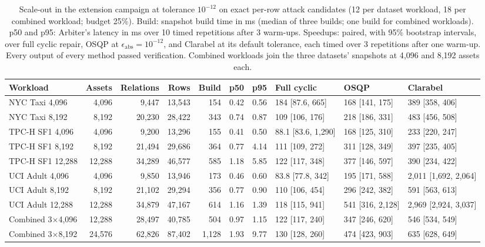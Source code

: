 \begin{table}[h]
\centering
\caption{Scale-out in the extension campaign at tolerance $10^{-12}$ on exact per-row attack candidates (12 per dataset workload, 18 per combined workload; budget 25\%). Build: snapshot build time in ms (median of three builds; one build for combined workloads). p50 and p95: Arbiter's latency in ms over 10 timed repetitions after 3 warm-ups. Speedups: paired, with 95\% bootstrap intervals, over full cyclic repair, OSQP at $\epsilon_{\mathrm{abs}} = 10^{-12}$, and Clarabel at its default tolerance, each timed over 3 repetitions after one warm-up. Every output of every method passed verification. Combined workloads join the three datasets' snapshots at 4{,}096 and 8{,}192 assets each.}
\label{tab:ext-scale}
\footnotesize
\setlength{\tabcolsep}{2.5pt}
\begin{tabular}{@{}lrrrrrrlll@{}}
\toprule
Workload & Assets & Relations & Rows & Build & p50 & p95 & Full cyclic & OSQP & Clarabel \\
\midrule
NYC Taxi 4{,}096 & 4{,}096 & 9{,}447 & 13{,}543 & 154 & 0.42 & 0.56 & 184 [87.6, 665] & 168 [141, 175] & 389 [358, 406] \\
NYC Taxi 8{,}192 & 8{,}192 & 20{,}230 & 28{,}422 & 343 & 0.74 & 0.87 & 109 [106, 176] & 218 [186, 331] & 483 [456, 508] \\
TPC-H SF1 4{,}096 & 4{,}096 & 9{,}200 & 13{,}296 & 155 & 0.41 & 0.50 & 88.1 [83.6, 1{,}290] & 168 [125, 310] & 233 [220, 247] \\
TPC-H SF1 8{,}192 & 8{,}192 & 21{,}494 & 29{,}686 & 364 & 0.77 & 4.14 & 111 [109, 272] & 311 [128, 349] & 397 [235, 405] \\
TPC-H SF1 12{,}288 & 12{,}288 & 34{,}289 & 46{,}577 & 585 & 1.18 & 5.85 & 122 [117, 348] & 377 [146, 597] & 390 [234, 422] \\
UCI Adult 4{,}096 & 4{,}096 & 9{,}850 & 13{,}946 & 173 & 0.46 & 0.60 & 83.8 [77.8, 342] & 195 [171, 588] & 2{,}011 [1{,}692, 2{,}064] \\
UCI Adult 8{,}192 & 8{,}192 & 21{,}102 & 29{,}294 & 356 & 0.77 & 0.90 & 110 [106, 454] & 296 [242, 382] & 591 [563, 613] \\
UCI Adult 12{,}288 & 12{,}288 & 34{,}879 & 47{,}167 & 614 & 1.16 & 1.39 & 118 [115, 941] & 541 [316, 2{,}128] & 2{,}969 [2{,}924, 3{,}037] \\
Combined 3$\times$4{,}096 & 12{,}288 & 28{,}497 & 40{,}785 & 504 & 0.97 & 1.15 & 122 [117, 240] & 347 [246, 620] & 546 [534, 549] \\
Combined 3$\times$8{,}192 & 24{,}576 & 62{,}826 & 87{,}402 & 1{,}128 & 1.93 & 9.77 & 130 [128, 260] & 474 [423, 903] & 635 [628, 649] \\
\bottomrule
\end{tabular}
\end{table}
